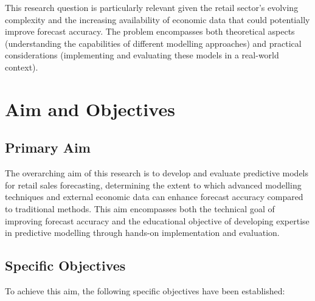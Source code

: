 \documentclass[12pt,a4paper]{report}
\begin{document}
This research question is particularly relevant given the retail sector's evolving complexity and the increasing availability of economic data that could potentially improve forecast accuracy. The problem encompasses both theoretical aspects (understanding the capabilities of different modelling approaches) and practical considerations (implementing and evaluating these models in a real-world context).

\section{Aim and Objectives}

\subsection{Primary Aim}
The overarching aim of this research is to develop and evaluate predictive models for retail sales forecasting, determining the extent to which advanced modelling techniques and external economic data can enhance forecast accuracy compared to traditional methods. This aim encompasses both the technical goal of improving forecast accuracy and the educational objective of developing expertise in predictive modelling through hands-on implementation and evaluation.

\subsection{Specific Objectives}
To achieve this aim, the following specific objectives have been established:
\end{document}
